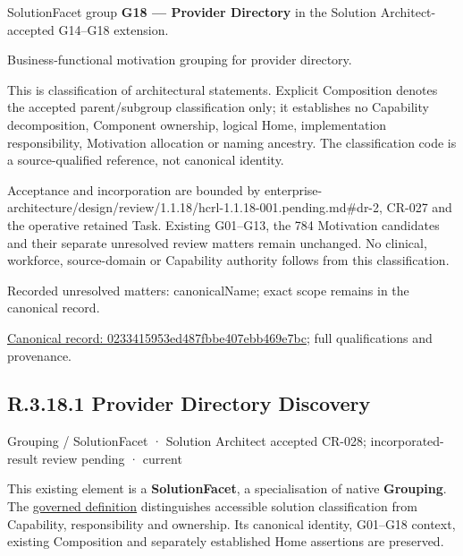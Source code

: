 SolutionFacet group \textbf{G18 — Provider Directory} in the Solution Architect-accepted G14–G18 extension.



Business-functional motivation grouping for provider directory.



This is classification of architectural statements. Explicit Composition denotes the accepted parent/subgroup classification only; it establishes no Capability decomposition, Component ownership, logical Home, implementation responsibility, Motivation allocation or naming ancestry. The classification code is a source-qualified reference, not canonical identity.



Acceptance and incorporation are bounded by enterprise-architecture/design/review/1.1.18/hcrl-1.1.18-001.pending.md\#dr-2, CR-027 and the operative retained Task. Existing G01–G13, the 784 Motivation candidates and their separate unresolved review matters remain unchanged. No clinical, workforce, source-domain or Capability authority follows from this classification.


{\small Recorded unresolved matters: canonicalName; exact scope remains in the canonical record.}\par
{\footnotesize \href{../../../../../../../continuum/grouping/0233415953ed487fbbe407ebb469e7bc.md}{Canonical record: 0233415953ed487fbbe407ebb469e7bc}; full qualifications and provenance.}\par
\subsection*{R.3.18.1 Provider Directory Discovery}
\label{navigation:R.3.18.1}

\label{element:c445fc55a6e547ae9b1a5bb43cad1a8e}
{\small Grouping / SolutionFacet · Solution Architect accepted CR-028; incorporated-result review pending · current}\par

This existing element is a \textbf{SolutionFacet}, a specialisation of native
\textbf{Grouping}. The \href{\detokenize{../../../../../../../governance/continuum-representation.md#solutionfacet-classification--1119-candidate}}{governed definition}
distinguishes accessible solution classification from Capability, responsibility
and ownership. Its canonical identity, G01–G18 context, existing Composition
and separately established Home assertions are preserved.



